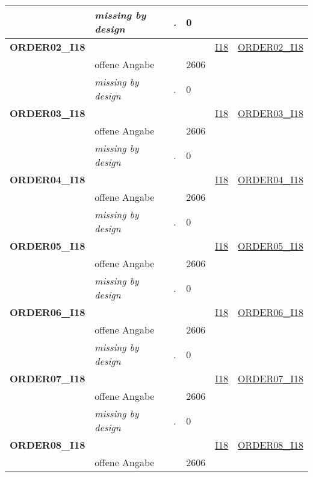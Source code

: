 \begin{longtable}{| L{2.45cm} | L{6cm} | C{1.5cm} | R{1cm} | C{2.25cm} | C{2.25cm} |}
   & \textit{missing by design} & \textit{.} & 0 &  &  \\ 
   \midrule
\textbf{ORDER02\_I18}\label{var:ORDER02:I18} & \textbf{} &  &  & \hyperref[I18]{I18} & \hyperref[var:suf:ORDER02:I18]{ORDER02\_I18} \\ 
   & offene Angabe &  & 2606 &  &  \\ 
   & \textit{missing by design} & \textit{.} & 0 &  &  \\ 
   \midrule
\textbf{ORDER03\_I18}\label{var:ORDER03:I18} & \textbf{} &  &  & \hyperref[I18]{I18} & \hyperref[var:suf:ORDER03:I18]{ORDER03\_I18} \\ 
   & offene Angabe &  & 2606 &  &  \\ 
   & \textit{missing by design} & \textit{.} & 0 &  &  \\ 
   \midrule
\textbf{ORDER04\_I18}\label{var:ORDER04:I18} & \textbf{} &  &  & \hyperref[I18]{I18} & \hyperref[var:suf:ORDER04:I18]{ORDER04\_I18} \\ 
   & offene Angabe &  & 2606 &  &  \\ 
   & \textit{missing by design} & \textit{.} & 0 &  &  \\ 
   \midrule
\textbf{ORDER05\_I18}\label{var:ORDER05:I18} & \textbf{} &  &  & \hyperref[I18]{I18} & \hyperref[var:suf:ORDER05:I18]{ORDER05\_I18} \\ 
   & offene Angabe &  & 2606 &  &  \\ 
   & \textit{missing by design} & \textit{.} & 0 &  &  \\ 
   \midrule
\textbf{ORDER06\_I18}\label{var:ORDER06:I18} & \textbf{} &  &  & \hyperref[I18]{I18} & \hyperref[var:suf:ORDER06:I18]{ORDER06\_I18} \\ 
   & offene Angabe &  & 2606 &  &  \\ 
   & \textit{missing by design} & \textit{.} & 0 &  &  \\ 
   \midrule
\textbf{ORDER07\_I18}\label{var:ORDER07:I18} & \textbf{} &  &  & \hyperref[I18]{I18} & \hyperref[var:suf:ORDER07:I18]{ORDER07\_I18} \\ 
   & offene Angabe &  & 2606 &  &  \\ 
   & \textit{missing by design} & \textit{.} & 0 &  &  \\ 
   \midrule
\textbf{ORDER08\_I18}\label{var:ORDER08:I18} & \textbf{} &  &  & \hyperref[I18]{I18} & \hyperref[var:suf:ORDER08:I18]{ORDER08\_I18} \\ 
   & offene Angabe &  & 2606 &  &  \\ 

\end{longtable}
